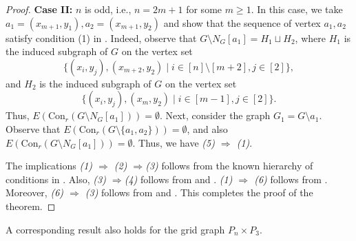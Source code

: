 \documentclass[12pt,reqno]{amsart}
\theoremstyle{definition}
\newcommand{\Con}{{\mathrm{Con}}}
\begin{document}
\begin{proof}
		\noindent
		{\bf Case II:} $n$ is odd, i.e., $n=2m+1$ for some $m\ge 1$. In this case, we take $a_1=(x_{m+1},y_1), a_2=(x_{m+1},y_2)$ and show that the sequence of vertex $a_1,a_2$ satisfy condition (1) in . Indeed, observe that $G\setminus N_G[a_1]=H_1\sqcup H_2$, where $H_1$ is the induced subgraph of $G$ on the vertex set 
        \[
        \{(x_i,y_j),(x_{m+2},y_2)\mid i\in [n]\setminus [m+2],j\in[2]\},
        \]
        and $H_2$ is the induced subgraph of $G$ on the vertex set 
        \[
        \{(x_i,y_j),(x_{m},y_2)\mid i\in [m-1],j\in[2]\}.
        \]
        Thus, $E(\Con_r(G\setminus N_G[a_1]))=\emptyset$. Next, consider the graph $G_1=G\setminus a_1$. Observe that $E(\Con_r(G\setminus \{a_1,a_2\}))=\emptyset$, and also $E(\Con_r(G\setminus N_G[a_1]))=\emptyset$. Thus, we have \emph{(5) $\Rightarrow$ (1)}.
		
		The implications \emph{(1) $\Rightarrow$ (2) $\Rightarrow$(3)} follows from the known hierarchy of conditions in . Also, \emph{(3) $\Rightarrow$(4)} follows from \cite[Theorem 3]{EagonReiner1998} and \cite[Theorem 1.4]{HaWoodroofe2014}. \emph{(1) $\Rightarrow$ (6)} follows from . Moreover, \emph{(6) $\Rightarrow$ (3)} follows from \cite[Theorem 3.3]{SBCC} and \cite[Theorem 3]{EagonReiner1998}. This completes the proof of the theorem.
	\end{proof}

   A corresponding result also holds for the grid graph $P_n \times P_3$.
\end{document}
